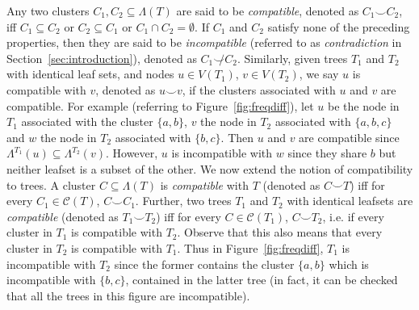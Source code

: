 \documentclass[12pt,a4paper]{article}
\newcommand{\compatible}{\smile}
\newcommand{\leafset}{\Lambda}
\begin{document}
    Any two clusters $C_1, C_2 \subseteq \leafset(T)$ are said to be \textit{compatible}, denoted as $C_1 \compatible C_2$, iff $C_1 \subseteq C_2$ or $C_2 \subseteq C_1$ or $C_1 \cap C_2 = \emptyset$. If $C_1$ and $C_2$ satisfy none of the preceding properties, then they are said to be \textit{incompatible} (referred to as \textit{contradiction} in Section~\ref{sec:introduction}), denoted as $C_1 \not\compatible C_2$. Similarly, given trees $T_1$ and $T_2$ with identical leaf sets, and nodes $u \in V(T_1)$, $v \in V(T_2)$, we say $u$ is compatible with $v$, denoted as $u \compatible v$, if the clusters associated with $u$ and $v$ are compatible. For example (referring to Figure~\ref{fig:freqdiff}), let $u$ be the node in $T_1$ associated with the cluster $\{a, b\}$, $v$ the node in $T_2$ associated with $\{a, b, c\}$ and $w$ the node in $T_2$ associated with $\{b, c\}$. Then $u$ and $v$ are compatible since $\leafset^{T_1}(u) \subseteq \leafset^{T_2}(v)$. However, $u$ is incompatible with $w$ since they share $b$ but neither leafset is a subset of the other. We now extend the notion of compatibility to trees. A cluster $C \subseteq \leafset(T)$ is \textit{compatible} with $T$ (denoted as $C \compatible T$) iff for every $C_1 \in \mathcal{C}(T)$, $C \compatible C_1$. Further, two trees $T_1$ and $T_2$ with identical leafsets are \textit{compatible} (denoted as $T_1 \compatible T_2$) iff for every $C \in \mathcal{C}(T_1)$, $C \compatible T_2$, i.e. if every cluster in $T_1$ is compatible with $T_2$. Observe that this also means that every cluster in $T_2$ is compatible with $T_1$. Thus in Figure~\ref{fig:freqdiff}, $T_1$ is incompatible with $T_2$ since the former contains the cluster $\{a, b\}$ which is incompatible with $\{b, c\}$, contained in the latter tree (in fact, it can be checked that all the trees in this figure are incompatible).
\end{document}
